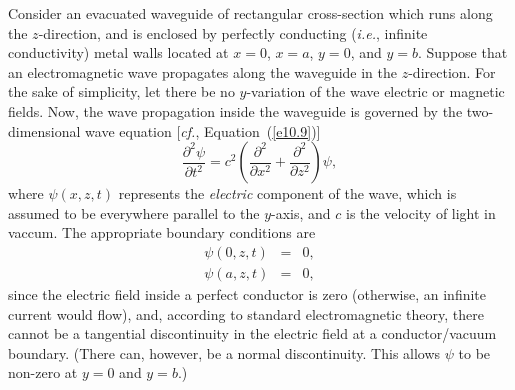 Consider an evacuated  waveguide of rectangular cross-section which runs along the $z$-direction, and is enclosed by perfectly conducting 
({\em i.e.}, infinite conductivity) metal walls located at $x=0$, $x=a$, $y=0$, and $y=b$. Suppose that an electromagnetic
wave propagates along the waveguide  in the $z$-direction. For the sake of simplicity, let there be no $y$-variation of the wave electric or magnetic fields.
 Now, the wave propagation inside the waveguide is governed by the two-dimensional wave equation [{\em cf.}, Equation~(\ref{e10.9})]
\begin{equation}\label{e10.20}
\frac{\partial^2\psi}{\partial t^2} = c^2\left(\frac{\partial^2}{\partial x^2}+ \frac{\partial^2}{\partial z^2}\right)\psi,
\end{equation}
where $\psi(x,z,t)$ represents the {\em electric}\/ component of the wave, which is assumed to be everywhere parallel to the $y$-axis, 
and $c$ is the velocity of light in vaccum. The appropriate boundary conditions are 
\begin{eqnarray}\label{e10.21}
\psi(0,z,t) &=&0,\\[0.5ex]
\psi(a,z,t) &=&0,\label{e10.22}
\end{eqnarray}
since the electric field inside a perfect conductor is zero (otherwise, an infinite current would flow), and, according to standard electromagnetic
theory,  there cannot be a  tangential discontinuity in the electric
field at a conductor/vacuum boundary. (There can, however, be a normal discontinuity. This allows $\psi$ to be non-zero at $y=0$ and $y=b$.)

